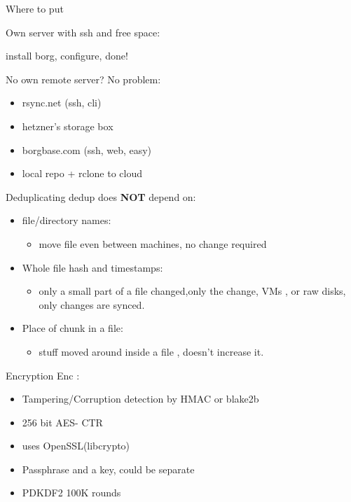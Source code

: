 \documentclass{beamer}
\begin{document}
\begin{frame}{Where to put}
	
	Own server with ssh and free space:
	
	install borg, configure, done!
	
	No own remote server? No problem:
	\begin{itemize}
		\item rsync.net (ssh, cli)
		\item hetzner's storage box
		\item borgbase.com (ssh, web, easy)
		\item local repo + rclone to cloud
	\end{itemize}
\end{frame}

\begin{frame}{Deduplicating}
	dedup does \textbf{NOT} depend on:
	\begin{itemize}
		\item file/directory names: 
		\begin{itemize}
			\item move file even between machines, no change required
		\end{itemize}
		 \item Whole file hash and timestamps:
		 \begin{itemize} 
		 	\item only a small part of a file changed,only the change, VMs , or raw disks, only changes are synced.
		\end{itemize}
		
		\item Place of chunk in a file:
		\begin{itemize}
			\item stuff moved around inside a file , doesn't increase it.
		\end{itemize} 
	
	\end{itemize}
\end{frame}

%	
%	
%	
%	

\begin{frame}{Encryption}
	Enc :
	\begin{itemize}
		\item  Tampering/Corruption detection by HMAC or blake2b
		
		\item 256 bit AES- CTR
		
		\item uses OpenSSL(libcrypto)
		
		\item Passphrase and a key, could be separate
		
		\item PDKDF2 100K rounds
		
	\end{itemize}
\end{frame}
\end{document}
